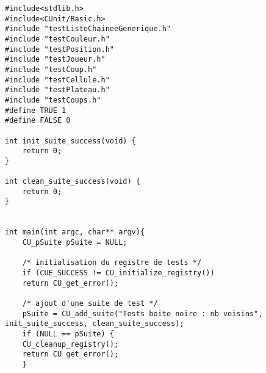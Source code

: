  
\begin{lstlisting}
#include<stdlib.h>
#include<CUnit/Basic.h>
#include "testListeChaineeGenerique.h"
#include "testCouleur.h"
#include "testPosition.h"
#include "testJoueur.h"
#include "testCoup.h"
#include "testCellule.h"
#include "testPlateau.h"
#include "testCoups.h"
#define TRUE 1
#define FALSE 0

int init_suite_success(void) {
	return 0;
}

int clean_suite_success(void) {
	return 0;
}


int main(int argc, char** argv){
	CU_pSuite pSuite = NULL;

	/* initialisation du registre de tests */
	if (CUE_SUCCESS != CU_initialize_registry())
	return CU_get_error();

	/* ajout d'une suite de test */
	pSuite = CU_add_suite("Tests boite noire : nb voisins", init_suite_success, clean_suite_success);
	if (NULL == pSuite) {
	CU_cleanup_registry();
	return CU_get_error();
	}


\end{lstlisting}
